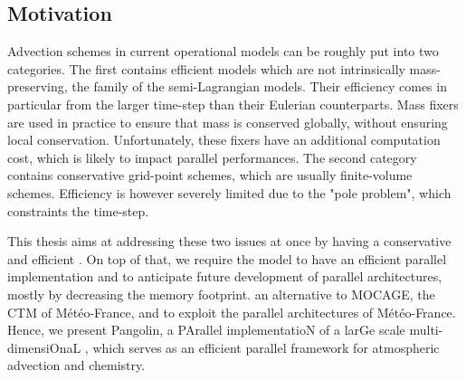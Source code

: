 \subsection*{Motivation}
Advection schemes in current operational models can be roughly put into two
categories. The first contains efficient models which are not intrinsically
mass-preserving, the family of the semi-Lagrangian models. Their efficiency comes in
particular from the larger time-step than their Eulerian counterparts.
Mass fixers are used in practice to ensure that mass is conserved globally,
without ensuring local conservation. Unfortunately, these fixers  have an
additional computation cost, which is likely to impact parallel performances.
The second category contains conservative grid-point schemes, which are usually
finite-volume schemes. Efficiency is however severely limited due to the "pole
problem", which constraints the time-step.

This thesis aims at addressing these two issues at once by having a conservative
and efficient \DIFdelbegin {}\DIFdelend \DIFaddbegin {}\DIFaddend . On top of that, we require the
model to have an efficient parallel implementation and to anticipate future
development of parallel architectures, mostly by decreasing the memory
footprint. \DIFdelbegin {}\DIFdelend \DIFaddbegin {}\DIFaddend an
alternative to MOCAGE, the CTM of M\'et\'eo-France, and to exploit the parallel
architectures of M\'et\'eo-France. Hence, we present Pangolin, a PArallel
implementatioN of a larGe scale multi-dimensiOnaL \DIFdelbegin {}\DIFdelend \DIFaddbegin {}\DIFaddend , which serves as an efficient parallel framework for atmospheric
advection and chemistry.

